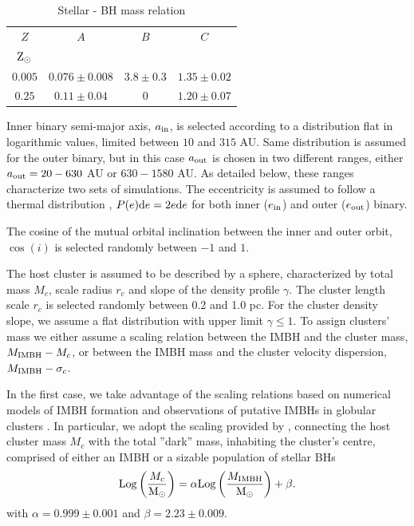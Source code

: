 \documentclass[twocolumn]{aastex62}
\newcommand{\Log}{{\rm Log}}
\newcommand{\Ms}{{\rm M}_\odot}
\newcommand{\Zs}{{\rm Z}_\odot}
\newcommand{\ibh}{{\rm IMBH}}
\newcommand{\inn}{{\rm in}}
\newcommand{\out}{{\rm out}}
\begin{document}
\begin{table}
    \centering
    \caption{Stellar - BH mass relation}
    \begin{tabular}{cccc}
        \hline
        \hline
        $Z$ & $A$ & $B$ & $C$ \\
        $\Zs$   &  & &  \\
    \hline    
        $0.005 $& $0.076\pm0.008$ & $3.8\pm0.3$ & $1.35\pm0.02$\\
        $0.25$  & $0.11\pm0.04$   & $0  $       & $1.20\pm0.07$\\
    \hline
    \end{tabular}
    \label{tab:t1}
\end{table}

Inner binary semi-major axis, $a_\inn$, is selected according to a distribution flat in logarithmic values, limited between $10$ and $315$ AU. Same distribution is assumed for the outer binary, but in this case $a_\out$ is chosen in two different ranges, either $a_\out=20-630$ AU or $630-1580$ AU. As detailed below, these ranges characterize two sets of simulations.
The eccentricity is assumed to follow a thermal distribution \citep{jeans19}, $P(e){\rm d}e = 2e{\rm d}e$ for both inner ($e_\inn$) and outer ($e_\out$) binary.

The cosine of the mutual orbital inclination between the inner and outer orbit, $\cos(i)$ is selected randomly between $-1$ and $1$.

The host cluster is assumed to be described by a \cite{Deh93} sphere, characterized by 
total mass $M_c$, scale radius $r_c$ and slope of the density profile $\gamma$.
The cluster length scale $r_c$ is selected randomly between 0.2 and 1.0 pc. For the cluster density slope, we assume a flat distribution with upper limit $\gamma \leq 1$.
To assign clusters' mass we either assume a scaling relation between the IMBH and the cluster mass, $M_\ibh - M_c$, or between the IMBH mass and the cluster velocity dispersion, $M_\ibh-\sigma_c$. 

In the first case, we take advantage of the scaling relations based on numerical models of IMBH formation and observations of putative IMBHs in globular clusters \citep{zwart02,Lutzgendorf13,AS16}. In particular, we adopt the scaling provided by \cite{AS16}, connecting the host cluster mass $M_c$ with the total ''dark'' mass, inhabiting the cluster's centre, comprised of either an IMBH or a sizable population of stellar BHs
\begin{equation}
\Log \left(\frac{M_c}{\Ms}\right) = \alpha \Log \left(\frac{M_\ibh}{\Ms}\right) + \beta.
\label{mcmibh}
\end{equation}
with $\alpha = 0.999 \pm 0.001$ and $\beta = 2.23 \pm 0.009$. 
\end{document}
